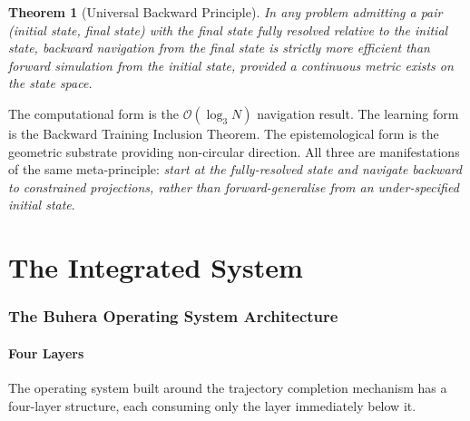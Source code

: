 \documentclass[twocolumn,11pt,a4paper]{article}
\newtheorem{theorem}{Theorem}[section]
\begin{document}
\begin{theorem}[Universal Backward Principle]
In any problem admitting a pair (initial state, final state) with the final state fully resolved relative to the initial state, backward navigation from the final state is strictly more efficient than forward simulation from the initial state, provided a continuous metric exists on the state space.
\end{theorem}

The computational form is the $\mathcal{O}(\log_3 N)$ navigation result. The learning form is the Backward Training Inclusion Theorem. The epistemological form is the geometric substrate providing non-circular direction. All three are manifestations of the same meta-principle: \emph{start at the fully-resolved state and navigate backward to constrained projections, rather than forward-generalise from an under-specified initial state}.


\part{The Integrated System}

\section{The Buhera Operating System Architecture}
\label{sec:architecture}

\subsection{Four Layers}

The operating system built around the trajectory completion mechanism has a four-layer structure, each consuming only the layer immediately below it.

\begin{center}
\end{center}
\end{document}
